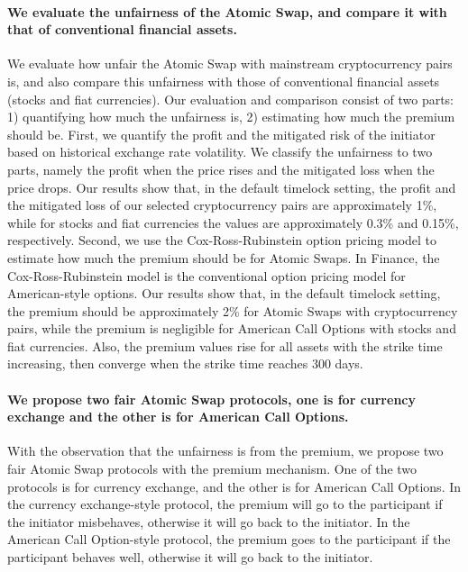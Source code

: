 \paragraph{We evaluate the unfairness of the Atomic Swap, and compare it with that of conventional financial assets.}
We evaluate how unfair the Atomic Swap with mainstream cryptocurrency pairs is, and also compare this unfairness with those of conventional financial assets (stocks and fiat currencies).
Our evaluation and comparison consist of two parts: 1) quantifying how much the unfairness is, 2) estimating how much the premium should be.
First, we quantify the profit and the mitigated risk of the initiator based on historical exchange rate volatility.
We classify the unfairness to two parts, namely the profit when the price rises and the mitigated loss when the price drops.
Our results show that, in the default timelock setting, the profit and the mitigated loss of our selected cryptocurrency pairs are approximately 1\%, while for stocks and fiat currencies the values are approximately 0.3\% and 0.15\%, respectively.
Second, we use the Cox-Ross-Rubinstein option pricing model to estimate how much the premium should be for Atomic Swaps.
In Finance, the Cox-Ross-Rubinstein model\cite{cox1979option} is the conventional option pricing model for American-style options.
Our results show that, in the default timelock setting, the premium should be approximately 2\% for Atomic Swaps with cryptocurrency pairs, while the premium is negligible for American Call Options with stocks and fiat currencies.
Also, the premium values rise for all assets with the strike time increasing, then converge when the strike time reaches 300 days.

\paragraph{We propose two fair Atomic Swap protocols, one is for currency exchange and the other is for American Call Options.}
With the observation that the unfairness is from the premium,
we propose two fair Atomic Swap protocols with the premium mechanism.
One of the two protocols is for currency exchange, and the other is for American Call Options.
In the currency exchange-style protocol, the premium will go to the participant if the initiator misbehaves, otherwise it will go back to the initiator.
In the American Call Option-style protocol, the premium goes to the participant if the participant behaves well, otherwise it will go back to the initiator.



